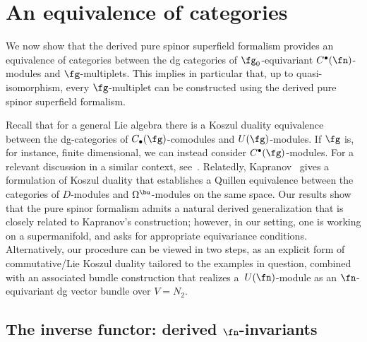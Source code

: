 \section{An equivalence of categories} \label{sec: equiv}
We now show that the derived pure spinor superfield formalism provides an equivalence of categories between the dg categories of $\fg_0$-equivariant $C^\bullet(\fn)$-modules and $\fg$-multiplets. This implies in particular that, up to quasi-isomorphism, every $\fg$-multiplet can be constructed using the derived pure spinor superfield formalism.

\begin{rmk}
	Recall that for a general Lie algebra there is a Koszul duality equivalence between the dg-categories of $C_\bullet(\fg)$-comodules and $U(\fg)$-modules. If $\fg$ is, for instance, finite dimensional, we can instead consider $C^\bullet(\fg)$-modules. For a relevant discussion in a similar context, see~\mbox{\cite[Sections~7 and~8]{CostelloYangian}}. Relatedly, Kapranov~\cite{Kapranov} gives a formulation of Koszul duality that establishes a Quillen equivalence between the categories of $D$-modules and $\Omega^\bu$-modules on the same space. Our results show that the pure spinor formalism admits a natural derived generalization that is closely related to Kapranov's construction; however, in our setting, one is working on a supermanifold, and asks for appropriate equivariance conditions. Alternatively, our procedure can be viewed in two steps, as an explicit form of commutative/Lie Koszul duality tailored to the examples in question, combined with an associated bundle construction that realizes a~$U(\fn)$-module as an $\fn$-equivariant dg vector bundle over $V = N_2$.
\end{rmk}

\subsection[The inverse functor: derived n-invariants]{The inverse functor: derived $\boldsymbol{\fn}$-invariants}

